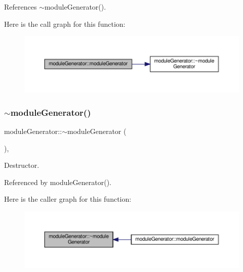 References $\sim$module\+Generator().

Here is the call graph for this function\+:
\nopagebreak
\begin{figure}[H]
\begin{center}
\leavevmode
\includegraphics[width=350pt]{d4/d94/classmoduleGenerator_a4b8eda51dd03d7cf90e378b10ee342e5_cgraph}
\end{center}
\end{figure}
\mbox{\label{classmoduleGenerator_a516f76a1ffc5455e691cd05c9569b590}} 
\subsubsection{\texorpdfstring{$\sim$module\+Generator()}{~moduleGenerator()}}
{\footnotesize\ttfamily module\+Generator\+::$\sim$module\+Generator (\begin{DoxyParamCaption}{ }\end{DoxyParamCaption})\hspace{0.3cm}{\ttfamily [virtual]}, {\ttfamily [default]}}



Destructor. 



Referenced by module\+Generator().

Here is the caller graph for this function\+:
\nopagebreak
\begin{figure}[H]
\begin{center}
\leavevmode
\includegraphics[width=350pt]{d4/d94/classmoduleGenerator_a516f76a1ffc5455e691cd05c9569b590_icgraph}
\end{center}
\end{figure}


